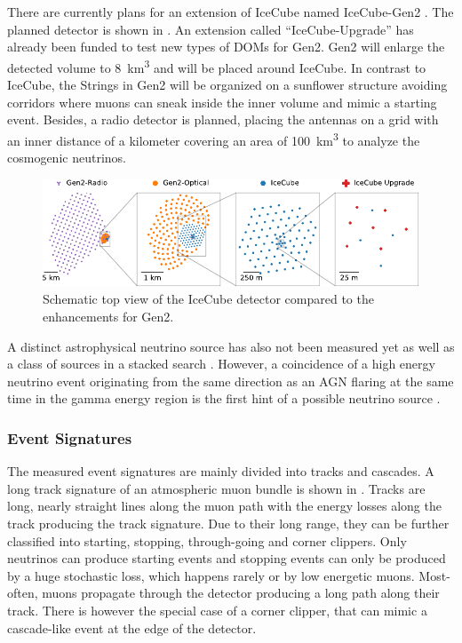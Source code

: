 There are currently plans for an extension of IceCube named IceCube-Gen2 \cite{IceCube20Gen2}.
The planned detector is shown in .
An extension called \enquote{IceCube-Upgrade} has already been funded to test new types of DOMs for Gen2.
Gen2 will enlarge the detected volume to \SI{8}{\cubic\kilo\meter} and will be placed around IceCube.
In contrast to IceCube, the Strings in Gen2 will be organized on a sunflower structure avoiding corridors where muons can sneak inside the inner volume and mimic a starting event.
Besides, a radio detector is planned, placing the antennas on a grid with an inner distance of a kilometer covering an area of \SI{100}{\cubic\kilo\meter} to analyze the cosmogenic neutrinos.
\begin{figure}
    \centering
    \includegraphics[width=\textwidth]{./images/detector_gen2.pdf}
    \caption{Schematic top view of the IceCube detector compared to the enhancements for Gen2. \cite{IceCube20Gen2}}
    \label{fig:detect_gen2}
\end{figure}

A distinct astrophysical neutrino source has also not been measured yet as well as a class of sources in a stacked search \cite{IceCube20PointSource, IceCube17BlazarStacking}.
However, a coincidence of a high energy neutrino event originating from the same direction as an AGN flaring at the same time in the gamma energy region is the first hint of a possible neutrino source \cite{IceCube18MMA, IceCube18TXS}.

\subsubsection{Event Signatures}

The measured event signatures are mainly divided into tracks and cascades.
A long track signature of an atmospheric muon bundle is shown in .
Tracks are long, nearly straight lines along the muon path with the energy losses along the track producing the track signature.
Due to their long range, they can be further classified into starting, stopping, through-going and corner clippers.
Only neutrinos can produce starting events and stopping events can only be produced by a huge stochastic loss, which happens rarely or by low energetic muons.
Most-often, muons propagate through the detector producing a long path along their track.
There is however the special case of a corner clipper, that can mimic a cascade-like event at the edge of the detector.

